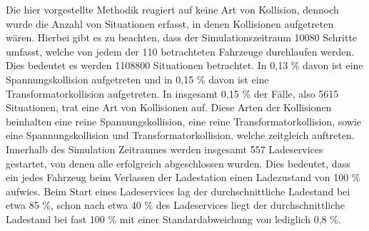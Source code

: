 Die hier vorgestellte Methodik reagiert auf keine Art von Kollision, dennoch wurde die Anzahl von Situationen erfasst, in denen Kollisionen aufgetreten wären. Hierbei gibt es zu beachten, dass der Simulationszeitraum 10080 Schritte umfasst, welche von jedem der 110 betrachteten Fahrzeuge durchlaufen werden. Dies bedeutet es werden 1108800 Situationen betrachtet. In 0,13 \% davon ist eine Spannungskollision aufgetreten und in 0,15 \% davon ist eine Transformatorkollision aufgetreten. In insgesamt 0,15 \% der Fälle, also 5615 Situationen, trat eine Art von Kollisionen auf. Diese Arten der Kollisionen beinhalten eine reine Spannungskollision, eine reine Transformatorkollision, sowie eine Spannungskollision und Transformatorkollision, welche zeitgleich auftreten. \\
Innerhalb des Simulation Zeitraumes werden insgesamt 557 Ladeservices gestartet, von denen alle erfolgreich abgeschlossen wurden. Dies bedeutet, dass ein jedes Fahrzeug beim Verlassen der Ladestation einen Ladezustand von 100 \% aufwies. Beim Start eines Ladeservices lag der durchschnittliche Ladestand bei etwa 85 \%, schon nach etwa 40 \% des Ladeservices liegt der durchschnittliche Ladestand bei fast 100 \% mit einer Standardabweichung von lediglich 0,8 \%. 
